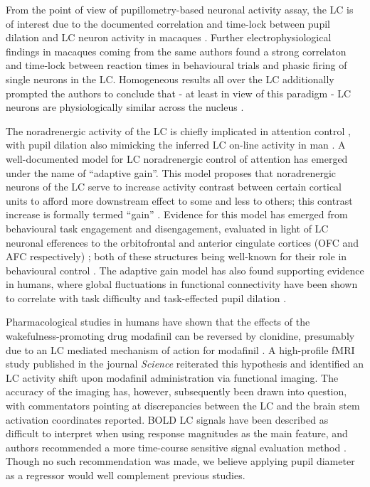 	From the point of view of pupillometry-based neuronal activity assay, the LC is of interest due to the documented correlation and time-lock between pupil dilation and LC neuron activity in macaques \cite{Rajkowski1994}.
	Further electrophysiological findings in macaques coming from the same authors \cite{Rajkowski2004} found a strong correlaton and time-lock between reaction times in behavioural trials and phasic firing of single neurons in the LC.
	Homogeneous results all over the LC additionally prompted the authors to conclude that - at least in view of this paradigm - LC neurons are physiologically similar across the nucleus \cite{Rajkowski2004}.
	
	The noradrenergic activity of the LC is chiefly implicated in attention control \cite{Aston-Jones1994,Gabay2011}, with pupil dilation also mimicking the inferred LC on-line activity in man \cite{Gabay2011}.
	A well-documented model for LC noradrenergic control of attention has emerged under the name of “adaptive gain”.
	This model proposes that noradrenergic neurons of the LC serve to increase activity contrast between certain cortical units to afford more downstream effect to some and less to others; this contrast increase is formally termed “gain”  \cite{Aston-Jones2005}.
	Evidence for this model has emerged from behavioural task engagement and disengagement, evaluated in light of LC neuronal efferences to the orbitofrontal and anterior cingulate cortices (OFC and AFC respectively) \cite{Aston-Jones2005}; both of these structures being well-known for their role in behavioural control \cite{Baxter2013,Kerns2004}.
	The adaptive gain model has also found supporting evidence in humans, where global fluctuations in functional connectivity have been shown to correlate with task difficulty and task-effected pupil dilation \cite{Eldar2013}.
	
	Pharmacological studies in humans have shown that the effects of the wakefulness-promoting drug \cite{Engber1998} modafinil can be reversed by clonidine, presumably due to an LC mediated mechanism of action for modafinil \cite{Hou2005}.
	A high-profile fMRI study published in the journal \textit{Science} reiterated this hypothesis and identified an LC activity shift upon modafinil administration via functional imaging.
	The accuracy of the imaging has, however, subsequently been drawn into question, with commentators \cite{Astafiev2010} pointing at discrepancies between the LC and the brain stem activation coordinates reported.  
	BOLD LC signals have been described as difficult to interpret when using response magnitudes as the main feature, and authors recommended a more time-course sensitive signal evaluation method \cite{Astafiev2010}.
	Though no such recommendation was made, we believe applying pupil diameter as a regressor would well complement previous studies. 

